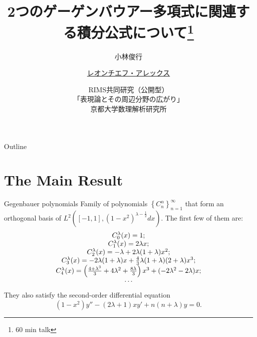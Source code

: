 \documentclass[pdf,notes]{beamer}
\title[2つのゲーゲンバウアー多項式に\dots]{2つのゲーゲンバウアー多項式に関連する積分公式について\footnote{60 min talk}}
\author[レオンチエフ・アレックス]{小林俊行\inst{1} \and \underline{レオンチエフ・アレックス}\inst{2}}
\institute[東大] %
{
  \inst{1}%
  大学院数理科学研究科、カブリ数物連携宇宙研究機構\\
  東京大学
  \and
  \inst{2}%
  大学院数理科学研究科\\
  東京大学
  }
\date[表現論とその周辺分野\dots]{RIMS共同研究（公開型）\\「表現論とその周辺分野の広がり」\\京都大学数理解析研究所}
\begin{document}
\begin{frame}\titlepage\end{frame}

\begin{frame}{Outline}
	\tableofcontents
\end{frame}
\section{The Main Result}
\begin{frame}{Gegenbauer polynomials}
	Family of polynomials $\left\{ C_n^\alpha \right\}_{n=1}^{\infty}$ that form an orthogonal basis of $L^2\left( [-1,1],(1-x^2)^{\lambda-\frac{1}{2}}dx \right)$.
	The first few of them are:
	\begin{equation*}
		\begin{array}[]{c}
			C_0^\lambda(x)=1;\\
			C_1^\lambda(x)=2\lambda x;\\
			C_2^\lambda(x)=-\lambda+2\lambda(1+\lambda)x^2;\\
			C_3^\lambda(x)=-2\lambda(1+\lambda)x+\frac{4}{3}\lambda(1+\lambda)(2+\lambda)x^3;\\
			C_4^\lambda(x)=\left(\frac{4+\lambda^3}{3}+4\lambda^2+\frac{8\lambda}{3}  \right)x^3+(-2\lambda^2-2\lambda)x;\\
			\cdots
		\end{array}
	\end{equation*}
	They also satisfy the second-order differential equation\begin{equation*}
		(1-x^2)y''-(2\lambda+1)xy'+n(n+\lambda)y=0.
	\end{equation*}
\end{frame}
\end{document}

